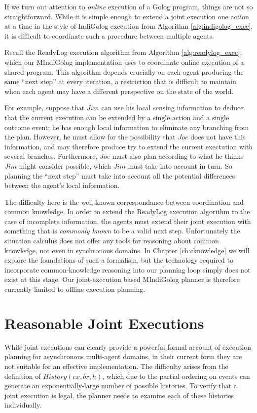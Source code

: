 If we turn out attention to \emph{online} execution of a Golog program,
things are not so straightforward. While it is simple enough to extend
a joint execution one action at a time in the style of IndiGolog execution
from Algorithm \ref{alg:indigolog_exec}, it is difficult to coordinate
such a procedure between multiple agents.

Recall the ReadyLog execution algorithm from Algorithm \ref{alg:readylog_exec},
which our MIndiGolog implementation uses to coordinate online execution
of a shared program. This algorithm depends crucially on each agent
producing the same {}``next step'' at every iteration, a restriction
that is difficult to maintain when each agent may have a different
perspective on the state of the world.

For example, suppose that $Jim$ can use his local sensing information
to deduce that the current execution can be extended by a single action
and a single outcome event; he has enough local information to eliminate
any branching from the plan. However, he must allow for the possibility
that $Joe$ does not have this information, and may therefore produce
try to extend the current exectution with several branches. Furthermore,
$Joe$ must also plan according to what he thinks $Jim$ might consider
possible, which $Jim$ must take into account in turn. So planning
the {}``next step'' must take into account all the potential differences
between the agent's local information.

The difficulty here is the well-known correspondance between coordination
and common knowledge. In order to extend the ReadyLog execution algorithm
to the case of incomplete information, the agents must extend their
joint execution with something that is \emph{commonly known} to be
a valid next step. Unfortunately the situation calculus does not offer
any tools for reasoning about common knowledge, not even in synchronous
domains. In Chapter \ref{ch:cknowledge} we will explore the foundations
of such a formalism, but the technology required to incorporate common-knowledge
reasoning into our planning loop simply does not exist at this stage.
Our joint-execution based MIndiGolog planner is therefore currently
limited to offline execution planning.


\section{Reasonable Joint Executions\label{sec:JointExec:Reasonable}}

While joint executions can clearly provide a powerful formal account
of execution planning for asynchronous multi-agent domains, in their
current form they are not suitable for an effective implementation.
The difficulty arises from the definition of $History(ex,br,h)$,
which due to the partial ordering on events can generate an exponentially-large
number of possible histories. To verify that a joint execution is
legal, the planner needs to examine each of these histories individually.

